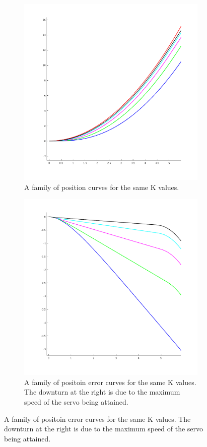 \documentclass[11pt,a4paper]{article}
\begin{document}
\begin{enumerate}
\begin{figure}[h!]
	\centering
	\begin{subfigure}{.5\textwidth}
		\centering
		\includegraphics[width = \textwidth]{imglab/lab4sol_paraposkfam.png}
		\caption{A family of position curves for the same K values.}
	\end{subfigure}%
	\begin{subfigure}{.5\textwidth}
		\centering
		\includegraphics[width = \textwidth]{imglab/lab4sol_paraposerr.png}
		\caption{A family of positoin error curves for the same K values. The downturn at the right is due to the maximum speed of the servo being attained.}	
	\end{subfigure}
\end{figure}


\end{enumerate}
\end{document}
